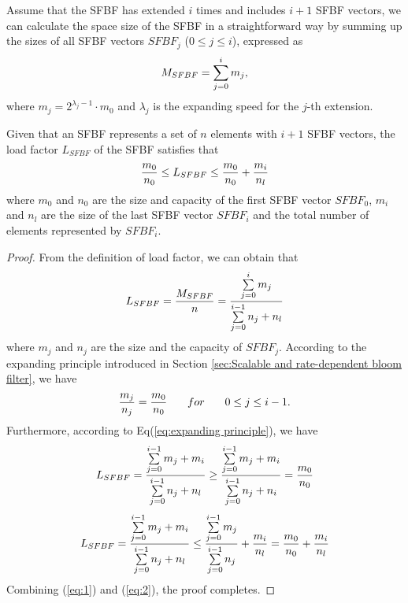 \documentclass[10pt,journal,letterpaper]{IEEEtran}
\begin{document}
Assume that the SFBF has extended $i$ times and includes $i+1$ SFBF vectors, we can calculate the space size of the SFBF in a straightforward way by summing up the sizes of all SFBF vectors $SFBF_j$ ($0 \le j \le i$), expressed as
\begin{equation}
\footnotesize
{M_{SFBF}} = \sum\limits_{j = 0}^i {{m_j}},
\end{equation}
where ${m_j} = {2^{{\lambda _j} -1 }} \cdot {m_0}$ and  $\lambda _j$ is the expanding speed for the $j$-th extension.
\begin{theorem}
\label{th:Load factor}
Given that an SFBF represents a set of $n$ elements with $i+1$ SFBF vectors, the load factor $L_{SFBF}$ of the SFBF satisfies that
\begin{equation}
\footnotesize
\frac{{{m_0}}}{{{n_0}}} \le {L_{SFBF}} \le \frac{{{m_0}}}{{{n_0}}} + \frac{{{m_i}}}{n_{l}}
\end{equation}
where  $m_0$ and $n_0$ are the size and capacity of the first SFBF vector $SFBF_0$,  $m_i$ and $n_{l}$ are the size of the last SFBF vector $SFBF_i$ and the total number of elements represented by $SFBF_i$.
\end{theorem}
\begin{proof}
From the definition of load factor, we can obtain that
\begin{equation}
\footnotesize
{L_{SFBF}} = \frac{{{M_{SFBF}}}}{n} = \frac{{\sum\limits_{j = 0}^i {{m_j}} }}{{\sum\limits_{j = 0}^{i - 1} {{n_j} + n_l} }}
\end{equation}
where $m_j$ and $n_j$ are the size and the capacity of $SFBF_j$.
According to the expanding principle introduced in Section \ref{sec:Scalable and rate-dependent bloom filter}, we have
\begin{equation}
\footnotesize
\frac{{{m_j}}}{{{n_j}}} = \frac{{{m_0}}}{{{n_0}}} \qquad  for  \qquad  0 \le j \le i - 1.
\label{eq:expanding principle}
\end{equation}
Furthermore, according to Eq(\ref{eq:expanding principle}), we have
\begin{equation}
\footnotesize
{L_{SFBF}} = \frac{{\sum\limits_{j = 0}^{i - 1} {{m_j} + {m_i}} }}{{\sum\limits_{j = 0}^{i - 1} {{n_j} + n_{l}} }} \ge \frac{{\sum\limits_{j = 0}^{i - 1} {{m_j} + {m_i}} }}{{\sum\limits_{j = 0}^{i - 1} {{n_j} + {n_i}} }} = \frac{{{m_0}}}{{{n_0}}}
\label{eq:1}
\end{equation}
\begin{equation}
\footnotesize
{L_{SFBF}} = \frac{{\sum\limits_{j = 0}^{i - 1} {{m_j} + {m_i}} }}{{\sum\limits_{j = 0}^{i - 1} {{n_j} + n_{l}} }} \le \frac{{\sum\limits_{j = 0}^{i - 1} {{m_j}} }}{{\sum\limits_{j = 0}^{i - 1} {{n_j}} }} + \frac{{{m_i}}}{n_{l}} = \frac{{{m_0}}}{{{n_0}}} + \frac{{{m_i}}}{n_{l}}
\label{eq:2}
\end{equation}
Combining (\ref{eq:1}) and (\ref{eq:2}), the proof completes.
\end{proof}
\end{document}
